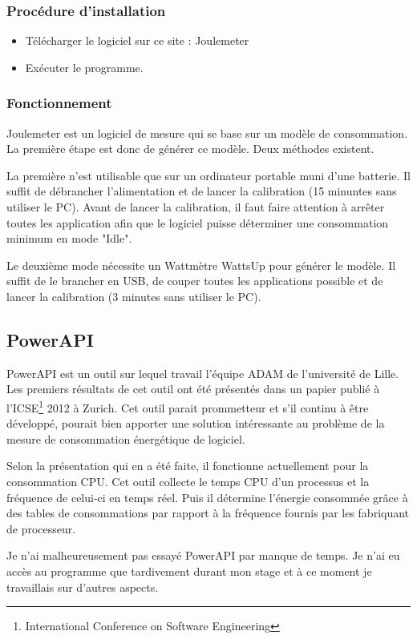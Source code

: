 \documentclass[a4paper, 11pt]{report}
\begin{document}
\subsubsection{Procédure d'installation}
\begin{itemize}
	\item Télécharger le logiciel sur ce site : Joulemeter
	\item Exécuter le programme.
\end{itemize}

\subsubsection{Fonctionnement}
Joulemeter est un logiciel de mesure qui se base sur un modèle de consommation. La première étape est donc de générer ce modèle. Deux méthodes existent.

La première n’est utilisable que sur un ordinateur portable muni d’une batterie. Il suffit de débrancher l’alimentation et de lancer la calibration (15 minuntes sans utiliser le PC). Avant de lancer la calibration, il faut faire attention à arrêter toutes les application afin que le logiciel puisse déterminer une consommation minimum en mode "Idle".

Le deuxième mode nécessite un Wattmètre WattsUp pour générer le modèle. Il suffit de le brancher en USB, de couper toutes les applications possible et de lancer la calibration (3 minutes sans utiliser le PC).

\subsection{PowerAPI}
PowerAPI est un outil sur lequel travail l'équipe ADAM de l'université de Lille. Les premiers résultats de cet outil ont été présentés dans un papier\cite{noureddine:hal-00681560} publié à l'ICSE\footnote{International Conference on Software Engineering} 2012 à Zurich. Cet outil parait prommetteur et s'il continu à être développé, pourait bien apporter une solution intéressante au problème de la mesure de consommation énergétique de logiciel.

Selon la présentation qui en a été faite, il fonctionne actuellement pour la consommation CPU. Cet outil collecte le temps CPU d'un processus et la fréquence de celui-ci en temps réel. Puis il détermine l'énergie consommée grâce à des tables de consommations par rapport à la fréquence fournis par les fabriquant de processeur.

Je n'ai malheureusement pas essayé PowerAPI par manque de temps. Je n'ai eu accès au programme que tardivement durant mon stage et à ce moment je travaillais sur d'autres aspects.
\end{document}
